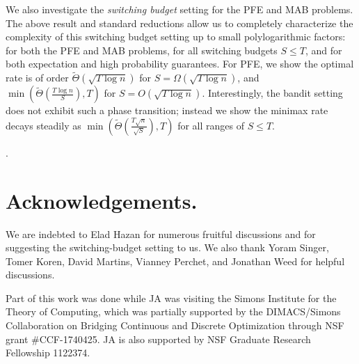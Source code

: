 \documentclass[final,12pt]{colt2018}
\begin{document}
\par We also investigate the \textit{switching budget} setting for the PFE and MAB problems. The above result and standard reductions allow us to completely characterize the complexity of this switching budget setting up to small polylogarithmic factors: for both the PFE and MAB problems, for all switching budgets $S \leq T$, and for both expectation and high probability guarantees. For PFE, we show the optimal rate is of order $\tilde{\Theta}(\sqrt{T\log n})$ for $S = \Omega(\sqrt{T\log n})$, and $\min(\tilde{\Theta}(\tfrac{T\log n}{S}), T)$ for $S = O(\sqrt{T \log n})$. Interestingly, the bandit setting does not exhibit such a phase transition; instead we show the minimax rate decays steadily as $\min(\tilde{\Theta}(\frac{T\sqrt{n}}{\sqrt{S}}), T)$ for all ranges of $S \leq T$.%

.

\section{Acknowledgements.} We are indebted to Elad Hazan for numerous fruitful discussions and for suggesting the switching-budget setting to us. We also thank Yoram Singer, Tomer Koren, David Martins, Vianney Perchet, and Jonathan Weed for helpful discussions.
\par Part of this work was done while JA was visiting the Simons Institute for the Theory of Computing, which was partially supported by the DIMACS/Simons Collaboration on Bridging Continuous and Discrete Optimization through NSF grant \#CCF-1740425. JA is also supported by NSF Graduate Research Fellowship 1122374.



\end{document}
